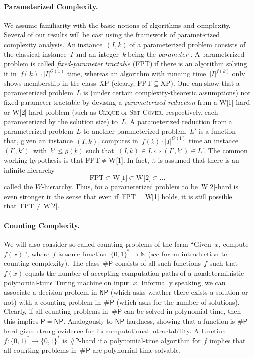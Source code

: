 \documentclass{article}
\newcommand{\np}{{\mathsf{NP}}}
\newcommand{\p}{{\mathsf{P}}}
\begin{document}
\paragraph{Parameterized Complexity.}
We assume familiarity with the basic notions of algorithms and complexity.
Several of our results will be cast using the framework of parameterized complexity analysis.
An instance~$(I,k)$ of a parameterized problem consists of the classical
instance~$I$ and an integer~$k$ being the \emph{parameter} \cite{DF13,FG06,Nie06,Cyg15}.
A parameterized problem is called \emph{fixed-parameter tractable} (FPT) if there is an algorithm solving it in~$f(k)\cdot|I|^{O(1)}$ time, whereas an algorithm with running time~$|I|^{f(k)}$ only shows membership in the class~XP (clearly, FPT${}\subseteq{}$XP).
One can show that a parameterized problem~$L$ is (under certain complexity-theoretic assumptions) not fixed-parameter tractable by devising a \emph{parameterized reduction} from a
W[1]-hard or W[2]-hard problem (such as \textsc{Clique} or \textsc{Set
Cover}, respectively, each parameterized by the solution size) to~$L$.
A parameterized reduction from a parameterized problem~$L$ to another parameterized problem~$L'$ is a function that, given an instance~$(I,k)$, computes in~$f(k)\cdot |I|^{O(1)}$ time an instance~$(I',k')$~with~$k' \le g (k)$ such that~$(I,k)\in L \Leftrightarrow (I',k')\in L'$.
The common working hypothesis is that FPT${}\neq{}$W[1]. In fact, it is assumed that there is an infinite hierarchy
$$\text{FPT}\subset\text{W[1]}\subset\text{W[2]}\subset\ldots$$
called the $W$-hierarchy. Thus, for a parameterized problem to be~W[2]-hard is even stronger
in the sense that even if~FPT${}={}$W[1] holds, it is still possible that~FPT${}\neq{}$W[2].

\paragraph{Counting Complexity.}
We will also consider so called counting problems of the form ``Given~$x$, compute $f(x)$.'', where~$f$ is some function~$\{0,1\}^*\to\mathbb{N}$ (see \citet[Chapter~9]{AB09} for an introduction to counting complexity).
The class~$\#\p$ consists of all such functions~$f$ such that~$f(x)$ equals the number of accepting computation paths of a nondeterministic polynomial-time Turing machine on input~$x$.
Informally speaking, we can associate a decision problem in $\np$ (which asks weather there exists a solution or not) with a counting problem in~$\#\p$ (which asks for the number of solutions).
Clearly, if all counting problems in~$\#\p$ can be solved in polynomial time, then this implies $\p=\np$.
Analogously to $\np$-hardness, showing that a function
is $\#\p$-hard gives strong evidence for its computational intractability.
A function~$f:\{0,1\}^*\to\{0,1\}^*$ is $\#\p$-hard if a polynomial-time algorithm for~$f$ implies that all counting problems in~$\#\p$ are polynomial-time solvable.
\end{document}
